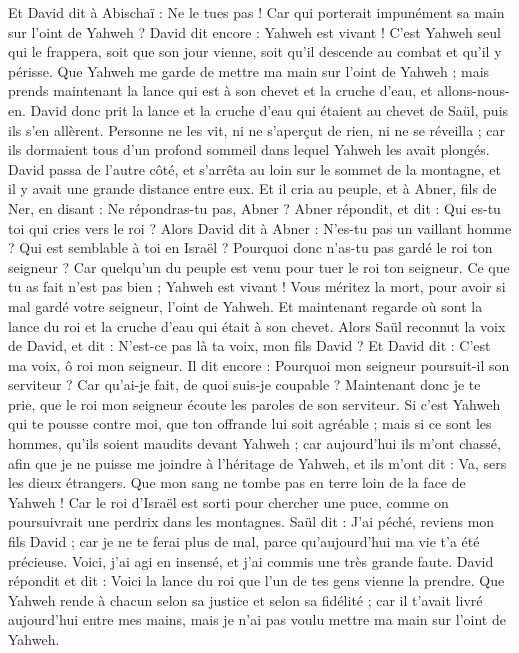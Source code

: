 \begin{multicols}{2}
Et David dit à Abischaï : Ne le tues pas ! Car qui porterait impunément sa main sur l'oint de Yahweh ?
David dit encore : Yahweh est vivant ! C’est Yahweh seul qui le frappera, soit que son jour vienne, soit qu'il descende au combat et qu'il y périsse.
Que Yahweh me garde de mettre ma main sur l'oint de Yahweh ; mais prends maintenant la lance qui est à son chevet et la cruche d’eau, et allons-nous-en.
David donc prit la lance et la cruche d’eau qui étaient au chevet de Saül, puis ils s'en allèrent. Personne ne les vit, ni ne s’aperçut de rien, ni ne se réveilla ; car ils dormaient tous d’un profond sommeil dans lequel Yahweh les avait plongés.
David passa de l'autre côté, et s'arrêta au loin sur le sommet de la montagne, et il y avait une grande distance entre eux.
Et il cria au peuple, et à Abner, fils de Ner, en disant : Ne répondras-tu pas, Abner ? Abner répondit, et dit : Qui es-tu toi qui cries vers le roi ?
Alors David dit à Abner : N'es-tu pas un vaillant homme ? Qui est semblable à toi en Israël ? Pourquoi donc n'as-tu pas gardé le roi ton seigneur ? Car quelqu'un du peuple est venu pour tuer le roi ton seigneur.
Ce que tu as fait n’est pas bien ; Yahweh est vivant ! Vous méritez la mort, pour avoir si mal gardé votre seigneur, l'oint de Yahweh. Et maintenant regarde où sont la lance du roi et la cruche d’eau qui était à son chevet.
Alors Saül reconnut la voix de David, et dit : N'est-ce pas là ta voix, mon fils David ? Et David dit : C'est ma voix, ô roi mon seigneur.
Il dit encore : Pourquoi mon seigneur poursuit-il son serviteur ? Car qu'ai-je fait, de quoi suis-je coupable ?
Maintenant donc je te prie, que le roi mon seigneur écoute les paroles de son serviteur. Si c'est Yahweh qui te pousse contre moi, que ton offrande lui soit agréable ; mais si ce sont les hommes, qu’ils soient maudits devant Yahweh ; car aujourd'hui ils m'ont chassé, afin que je ne puisse me joindre à l'héritage de Yahweh, et ils m'ont dit : Va, sers les dieux étrangers.
Que mon sang ne tombe pas en terre loin de la face de Yahweh ! Car le roi d’Israël est sorti pour chercher une puce, comme on poursuivrait une perdrix dans les montagnes.
Saül dit : J'ai péché, reviens mon fils David ; car je ne te ferai plus de mal, parce qu'aujourd'hui ma vie t'a été précieuse. Voici, j'ai agi en insensé, et j'ai commis une très grande faute.
David répondit et dit : Voici la lance du roi que l'un de tes gens vienne la prendre.
Que Yahweh rende à chacun selon sa justice et selon sa fidélité ; car il t'avait livré aujourd'hui entre mes mains, mais je n'ai pas voulu mettre ma main sur l'oint de Yahweh.

\end{multicols}

